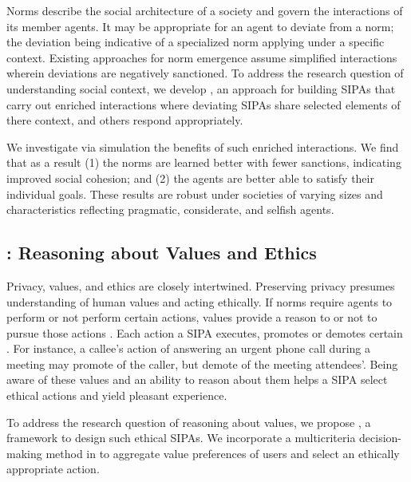 Norms describe the social architecture of a society
and govern the interactions of its member agents.
It may be appropriate for an agent to deviate from
a norm; the deviation being indicative of a specialized
norm applying under a specific context. Existing
approaches for norm emergence assume simplified
interactions wherein deviations are negatively
sanctioned. To address the research question of understanding
social context, we develop \frameworkB, an approach for
building SIPAs that carry out enriched interactions
where deviating SIPAs share selected elements of there 
context, and others respond appropriately.

We investigate via simulation the benefits
of such enriched interactions. We find
that as a result (1) the norms are learned better with
fewer sanctions, indicating improved social cohesion;
and (2) the agents are better able to satisfy
their individual goals. These results are robust under
societies of varying sizes and characteristics reflecting
pragmatic, considerate, and selfish agents.



\subsection[Reasoning about Values and Ethics]{\frameworkAinur: Reasoning about Values and Ethics}
Privacy, values, and ethics are closely intertwined. 
Preserving privacy presumes understanding of human values 
and acting ethically. 
% 
If norms require agents to perform or not perform certain actions,
values provide a reason to or not to pursue those actions
\citep{Dechesne-AIL13-Norms+Values}. Each action a \frameworkB SIPA
executes, promotes or demotes certain .
For instance, a callee's action of
answering an urgent phone call during a meeting may promote 
of the caller, but demote  of the meeting attendees'. 
Being aware of these values and an ability to reason about them 
helps a SIPA select ethical actions and yield pleasant experience.

To address the research question of reasoning about values, we 
propose \frameworkAinur, a framework to design such ethical 
SIPAs. We incorporate a multicriteria decision-making method 
in \frameworkAinur to aggregate value preferences of users and 
select an ethically appropriate action. 

